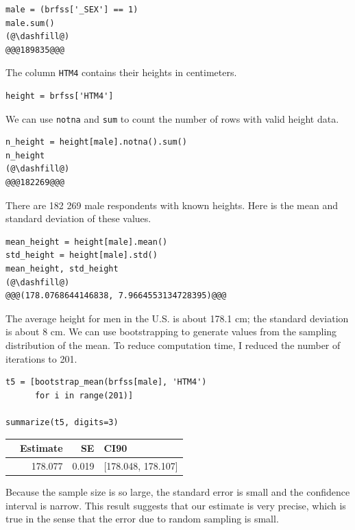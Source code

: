 \begin{lstlisting}[]
male = (brfss['_SEX'] == 1)
male.sum()
(@\dashfill@)
@@@189835@@@
\end{lstlisting}

The column \passthrough{\lstinline!HTM4!} contains their heights in
centimeters.

\begin{lstlisting}[]
height = brfss['HTM4']
\end{lstlisting}

We can use \passthrough{\lstinline!notna!} and
\passthrough{\lstinline!sum!} to count the number of rows with valid
height data.

\begin{lstlisting}[]
n_height = height[male].notna().sum()
n_height
(@\dashfill@)
@@@182269@@@
\end{lstlisting}

There are 182 269 male respondents with known heights. Here is the mean
and standard deviation of these values.

\begin{lstlisting}[]
mean_height = height[male].mean()
std_height = height[male].std()
mean_height, std_height
(@\dashfill@)
@@@(178.0768644146838, 7.9664553134728395)@@@
\end{lstlisting}

The average height for men in the U.S. is about 178.1 cm; the standard
deviation is about 8 cm. We can use bootstrapping to generate values
from the sampling distribution of the mean. To reduce computation time,
I reduced the number of iterations to 201.

\begin{lstlisting}[]
t5 = [bootstrap_mean(brfss[male], 'HTM4')
      for i in range(201)]

summarize(t5, digits=3)
\end{lstlisting}

\begin{tabular}{lrrl}
\midrule
{} &  Estimate &     SE &                CI90 \\
\midrule
{} &   178.077 &  0.019 &  [178.048, 178.107] \\
\midrule
\end{tabular}

Because the sample size is so large, the standard error is small and the
confidence interval is narrow. This result suggests that our estimate is
very precise, which is true in the sense that the error due to random
sampling is small.

